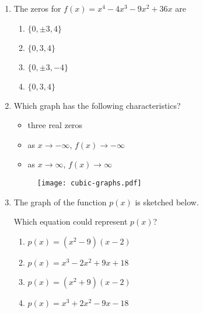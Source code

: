 \documentclass[12pt, oneside]{article}
\begin{document}
\begin{enumerate}
\newpage

\item The zeros for $f(x)=x^4-4x^3-9x^2+36x$ are
\begin{enumerate}
    \item $\{0, \pm 3, 4 \}$
    \item $\{0, 3, 4 \}$
    \item $\{0, \pm 3, -4 \}$
    \item $\{0, 3,4 \}$
\end{enumerate} %

\item Which graph has the following characteristics?
\begin{itemize}
\item three real zeros
\item as $x \rightarrow - \infty$, $f(x) \rightarrow - \infty$
\item as $x \rightarrow \infty$, $f(x) \rightarrow \infty$
\end{itemize}
\begin{figure}[!ht]
    \centering
    \texttt{[image: cubic-graphs.pdf]}
\end{figure} %

\newpage
\item The graph of the function $p(x)$ is sketched below.
\begin{center}
\end{center}
Which equation could represent $p(x)$?
\begin{enumerate}
    \item $p(x)=(x^2- 9)(x-2)$
    \item $p(x)=x^3 -2x^2+ 9x+18$
    \item $p(x)=(x^2+ 9)(x-2)$
    \item $p(x)=x^3 +2x^2- 9x-18$ \\[.5in]
\end{enumerate} %


\end{enumerate}
\end{document}
